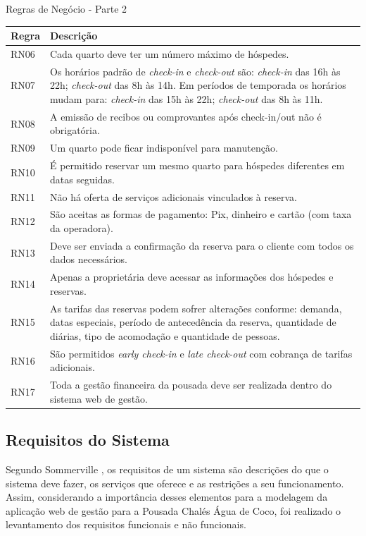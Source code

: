 \documentclass[
	12pt,				%
	openany,			%
	oneside,			%
	a4paper,			%
	english,			%
	french,				%
	spanish,			%
	brazil				%
	]{abntex2}
\begin{document}
\begin{quadro}[H]
	\caption{\label{quadro_rn_2}Regras de Negócio - Parte 2}
	\begin{tabular}{|>{\centering\arraybackslash}p{3cm}|p{11cm}|}
		\hline
		\textbf{Regra} & \textbf{Descrição}  \\ \hline	
		RN06 & Cada quarto deve ter um número máximo de hóspedes.   \\ \hline
		RN07 & Os horários padrão de \textit{check-in} e \textit{check-out} são: \textit{check-in} das 16h às 22h; \textit{check-out} das 8h às 14h. Em períodos de temporada os horários mudam para: \textit{check-in} das 15h às 22h; \textit{check-out} das 8h às 11h.\\ \hline
		RN08 & A emissão de recibos ou comprovantes após check-in/out não é obrigatória.   \\ \hline
		RN09 & Um quarto pode ficar indisponível para manutenção.   \\ \hline
		RN10 & É permitido reservar um mesmo quarto para hóspedes diferentes em datas seguidas.   \\ \hline
		RN11 & Não há oferta de serviços adicionais vinculados à reserva.   \\ \hline
		RN12 & São aceitas as formas de pagamento: Pix, dinheiro e cartão (com taxa da operadora).   \\ \hline
		RN13 & Deve ser enviada a confirmação da reserva para o cliente com todos os dados necessários.   \\ \hline
		RN14 & Apenas a proprietária deve acessar as informações dos hóspedes e reservas.   \\ \hline
		RN15 & As tarifas das reservas podem sofrer alterações conforme: demanda, datas especiais, período de antecedência da reserva, quantidade de diárias, tipo de acomodação e quantidade de pessoas.   \\ \hline
		RN16 & São permitidos \textit{early check-in} e \textit{late check-out} com cobrança de tarifas adicionais.   \\ \hline
		RN17 & Toda a gestão financeira da pousada deve ser realizada dentro do sistema web de gestão.   \\ \hline
	\end{tabular}
\end{quadro}
\subsection{Requisitos do Sistema}
Segundo Sommerville \cite[p.57]{sommerville2011}, os requisitos de um sistema são descrições do que o sistema deve fazer, os serviços que oferece e as restrições a seu funcionamento. Assim, considerando a importância desses elementos para a modelagem da aplicação web de gestão para a Pousada Chalés Água de Coco, foi realizado o levantamento dos requisitos funcionais e não funcionais. 
\end{document}
